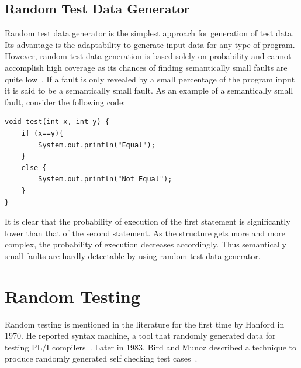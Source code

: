 

\subsection{Random Test Data Generator}
\label{sec:randomgenerator_2}
Random test data generator is the simplest approach for generation of test data. Its advantage is the adaptability to generate input data for any type of program. However, random test data generation is based solely on probability and cannot accomplish high coverage as its chances of finding semantically small faults are quite low~\cite{godefroid2005dart}. If a fault is only revealed by a small percentage of the program input it is said to be a semantically small fault. As an example of a semantically small fault, consider the following code:

\begin{lstlisting}
void test(int x, int y) {
    if (x==y){
        System.out.println("Equal");
    }
    else {
        System.out.println("Not Equal");
    }
}
\end{lstlisting}

It is clear that the probability of execution of the first statement is significantly lower than that of the second statement. As the structure gets more and more complex, the probability of execution decreases accordingly. Thus semantically small faults are hardly detectable by using random test data generator. 



\section{Random Testing}
Random testing is mentioned in the literature for the first time by Hanford in 1970. He reported syntax machine, a tool that randomly generated data for testing PL/I compilers~\cite{hanford1970automatic}. Later in 1983, Bird and Munoz described a technique to produce randomly generated self checking test cases~\cite{bird1983automatic}. 


